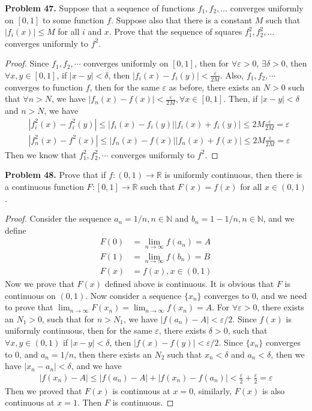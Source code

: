 \documentclass[12pt,leqno]{amsart}
\begin{document}
\medskip




\noindent
{\bf Problem 47.}
Suppose that a sequence of functions $f_1,f_2,\ldots$ converges uniformly on $[0,1]$ to some function $f$. Suppose also that there is a constant $M$ such that
$|f_i(x)|\leq M$ for all $i$ and $x$. Prove that the sequence of squares $f_1^2,f_2^2,\ldots$ converges uniformly to $f^2$.
\begin{proof}
Since $f_1,f_2,\cdots$ converges uniformly on $[0,1]$, then for $\forall \varepsilon >0$, $\exists \delta > 0$, then $\forall x,y \in [0,1]$, if $|x-y|<\delta$, then $|f_i(x) - f_i(y)| < \frac{\varepsilon}{2M}$. Also, $f_1,f_2,\cdots$ converges to function $f$, then for the same $\varepsilon$ as before, there exists an $N>0$ such that $\forall n>N$, we have $|f_n(x)-f(x)|<\frac{\varepsilon}{2M}, \forall x\in[0,1]$. Then, if $|x-y|<\delta$ and $n>N$, we have
\begin{align*}
    & |f_i^2(x)-f_i^2(y)|\leq |f_i(x)-f_i(y)| |f_i(x)+f_i(y)| \leq 2M \frac{\varepsilon}{2M} = \varepsilon \\
    & |f_n^2(x)-f^2(x)| \leq |f_n(x)-f(x)| |f_n(x)+f(x)| \leq 2M \frac{\varepsilon}{2M} = \varepsilon
\end{align*}
Then we know that $f_1^2, f_2^2, \cdots$ converges uniformly to $f^2$.
\end{proof}

\medskip

\noindent
{\bf Problem 48.}
Prove that if $f:(0,1)\to\mathbb{R}$ is uniformly continuous, then there is a continuous function $F:[0,1]\to\mathbb{R}$ such that $F(x)=f(x)$ for all $x\in (0,1)$.
\begin{proof}
Consider the sequence $a_n = 1/n, n\in \mathbb{N}$ and $b_n = 1-1/n, n\in \mathbb{N}$, and we define 
\begin{align*}
    F(0) &= \lim_{n\to\infty}f(a_n) = A \\
    F(1) &= \lim_{n\to\infty}f(b_n) = B\\
    F(x) &= f(x), x\in(0,1)
\end{align*}
Now we prove that $F(x)$ defined above is continuous. It is obvious that $F$ is continuous on $(0,1)$. Now consider a sequence $\{x_n\}$ converges to $0$, and we need to prove that $\lim_{n\to\infty}F(x_n) = \lim_{n\to\infty}f(x_n) = A$. For $\forall \varepsilon > 0$, there exists an $N_1>0$, such that for $n>N_1$, we have $|f(a_n) - A|<\varepsilon/2$. Since $f(x)$ is uniformly continuous, then for the same $\varepsilon$, there exists $\delta>0$, such that $\forall x,y\in(0,1)$ if $|x-y|<\delta$, then $|f(x)-f(y)|<\varepsilon/2$. Since $\{x_n\}$ converges to $0$, and $a_n=1/n$, then there exists an $N_2$ such that $x_n<\delta$ and $a_n<\delta$, then we have $|x_n-a_n|<\delta$, and we have
\begin{align*}
    |f(x_n)-A|\leq |f(a_n) - A|+|f(x_n)-f(a_n)|<\frac{\varepsilon}{2}+\frac{\varepsilon}{2} = \varepsilon
\end{align*}
Then we proved that $F(x)$ is continuous at $x=0$, similarly, $F(x)$ is also continuous at $x=1$. Then $F$ is continuous.
\end{proof}
\end{document}
